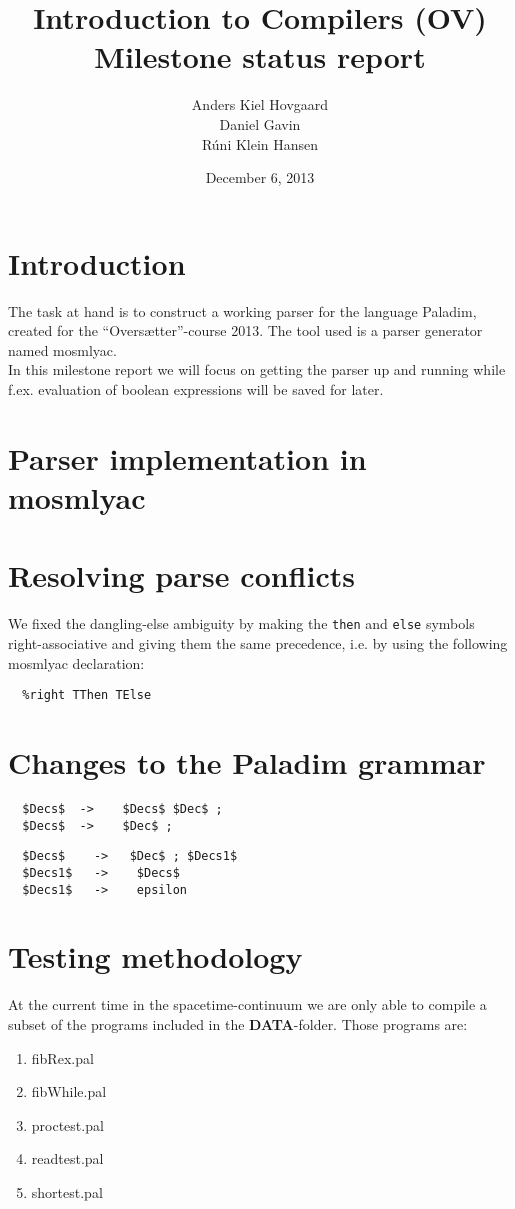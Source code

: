 \documentclass[12pt,a4paper]{article}
\begin{document}
\title{Introduction to Compilers (OV)\\
       Milestone status report}
\author{Anders Kiel Hovgaard\\
        Daniel Gavin\\
        Rúni Klein Hansen}
\date{December 6, 2013}
\maketitle

\section{Introduction}
The task at hand is to construct a working parser for the language Paladim,
created for the ``Oversætter''-course 2013. The tool used is a parser generator
named mosmlyac.\\
In this milestone report we will focus on getting the parser up and running
while f.ex. evaluation of boolean expressions will be saved for later.


\section{Parser implementation in mosmlyac}


\section{Resolving parse conflicts}
We fixed the dangling-else ambiguity by making the \texttt{then} and
\texttt{else} symbols right-associative and giving them the same precedence,
i.e. by using the following mosmlyac declaration:
\begin{verbatim}
  %right TThen TElse 
\end{verbatim}

\section{Changes to the Paladim grammar}
\begin{lstlisting}
  $Decs$  ->    $Decs$ $Dec$ ;
  $Decs$  ->    $Dec$ ;
\end{lstlisting}
\begin{lstlisting}
  $Decs$    ->   $Dec$ ; $Decs1$
  $Decs1$   ->    $Decs$
  $Decs1$   ->    epsilon
\end{lstlisting}

\section{Testing methodology}
At the current time in the spacetime-continuum we are only able to compile a subset
of the programs included in the \textbf{DATA}-folder. Those programs are:\\
\begin{enumerate}
  \item fibRex.pal
  \item fibWhile.pal
  \item proctest.pal
  \item readtest.pal
  \item shortest.pal
\end{enumerate}
\end{document}
